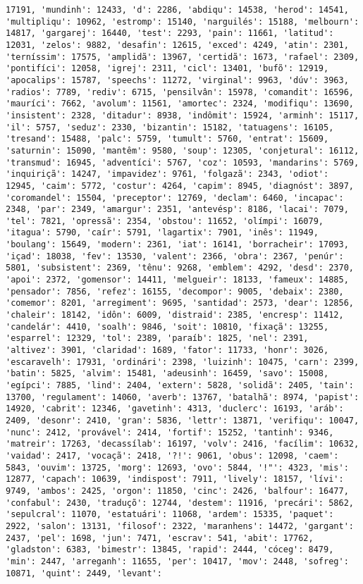 \begin{Verbatim}[commandchars=\\\{\}]
17191, 'mundinh': 12433, 'd': 2286, 'abdiqu': 14538, 'herod': 14541, 'multipliqu': 10962, 'estromp': 15140, 'narguilés': 15188, 'melbourn': 14817, 'gargarej': 16440, 'test': 2293, 'pain': 11661, 'latitud': 12031, 'zelos': 9882, 'desafin': 12615, 'exced': 4249, 'atin': 2301, 'terníssim': 17575, 'amplidã': 13967, 'certidã': 1673, 'rafael': 2309, 'pontifíci': 12058, 'igrej': 2311, 'cicl': 13401, 'bufõ': 12919, 'apocalips': 15787, 'speechs': 11272, 'virginal': 9963, 'dúv': 3963, 'radios': 7789, 'rediv': 6715, 'pensilvân': 15978, 'comandit': 16596, 'mauríci': 7662, 'avolum': 11561, 'amortec': 2324, 'modifiqu': 13690, 'insistent': 2328, 'ditadur': 8938, 'indômit': 15924, 'arminh': 15117, 'il': 5757, 'seduz': 2330, 'bizantin': 15182, 'tatuagens': 16105, 'tresand': 15488, 'palc': 5759, 'tumult': 5760, 'entrat': 15609, 'saturnin': 15090, 'mantêm': 9580, 'soup': 12305, 'conjetural': 16112, 'transmud': 16945, 'adventíci': 5767, 'coz': 10593, 'mandarins': 5769, 'inquiriçã': 14247, 'impavidez': 9761, 'folgazã': 2343, 'odiot': 12945, 'caim': 5772, 'costur': 4264, 'capim': 8945, 'diagnóst': 3897, 'coromandel': 15504, 'preceptor': 12769, 'declam': 6460, 'incapac': 2348, 'par': 2349, 'amargur': 2351, 'antevésp': 8186, 'lacai': 7079, 'tel': 7821, 'opressã': 2354, 'obstou': 11652, 'olímpi': 16079, 'itagua': 5790, 'caír': 5791, 'lagartix': 7901, 'inês': 11949, 'boulang': 15649, 'modern': 2361, 'iat': 16141, 'borracheir': 17093, 'içad': 18038, 'fev': 13530, 'valent': 2366, 'obra': 2367, 'penúr': 5801, 'subsistent': 2369, 'tênu': 9268, 'emblem': 4292, 'desd': 2370, 'apoi': 2372, 'gomensor': 14411, 'melgueir': 18133, 'fameux': 14885, 'pensador': 7856, 'refez': 16155, 'decompor': 9005, 'debaix': 2380, 'comemor': 8201, 'arregiment': 9695, 'santidad': 2573, 'dear': 12856, 'chaleir': 18142, 'idôn': 6009, 'distraid': 2385, 'encresp': 11412, 'candelár': 4410, 'soalh': 9846, 'soit': 10810, 'fixaçã': 13255, 'esparrel': 12329, 'tol': 2389, 'paraíb': 1825, 'nel': 2391, 'altivez': 3901, 'claridad': 1689, 'fator': 11733, 'honr': 3026, 'escaravelh': 17931, 'ordinári': 2398, 'luizinh': 10475, 'carn': 2399, 'batin': 5825, 'alvim': 15481, 'adeusinh': 16459, 'savo': 15008, 'egípci': 7885, 'lind': 2404, 'extern': 5828, 'solidã': 2405, 'tain': 13700, 'regulament': 14060, 'averb': 13767, 'batalhã': 8974, 'papist': 14920, 'cabrit': 12346, 'gavetinh': 4313, 'duclerc': 16193, 'aráb': 2409, 'desonr': 2410, 'gran': 5836, 'lettr': 13871, 'verifiqu': 10047, 'nunc': 2412, 'provável': 2414, 'fortif': 15252, 'tantinh': 9346, 'matreir': 17263, 'decassílab': 16197, 'volv': 2416, 'facílim': 10632, 'vaidad': 2417, 'vocaçã': 2418, '?!': 9061, 'obus': 12098, 'caem': 5843, 'ouvim': 13725, 'morg': 12693, 'ovo': 5844, '!"': 4323, 'mis': 12877, 'capach': 10639, 'indispost': 7911, 'lively': 18157, 'lívi': 9749, 'ambos': 2425, 'orgon': 11850, 'cinc': 2426, 'balfour': 16477, 'confabul': 2430, 'traduçõ': 12744, 'destem': 11916, 'precári': 5862, 'sepulcral': 11070, 'estatuári': 11068, 'ardem': 15335, 'paquet': 2922, 'salon': 13131, 'filosof': 2322, 'maranhens': 14472, 'gargant': 2437, 'pel': 1698, 'jun': 7471, 'escrav': 541, 'abit': 17762, 'gladston': 6383, 'bimestr': 13845, 'rapid': 2444, 'cóceg': 8479, 'min': 2447, 'arreganh': 11655, 'per': 10417, 'mov': 2448, 'sofreg': 10871, 'quint': 2449, 'levant': 
\end{Verbatim}
